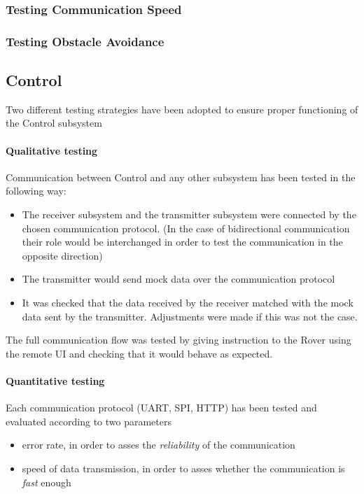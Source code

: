 \documentclass[10pt,twoside]{article}
\begin{document}
\subsubsection{Testing Communication Speed}

\subsubsection{Testing Obstacle Avoidance}


\subsection{Control}
Two different testing strategies have been adopted to ensure proper functioning of the Control subsystem
\paragraph{Qualitative testing} Communication between Control and any other subsystem has been tested in the following way:
\begin{itemize}[nolistsep]
    \item The receiver subsystem and the transmitter subsystem were connected by the chosen communication protocol. (In the case of bidirectional communication their role would be interchanged in order to test the communication in the opposite direction)
    \item The transmitter would send mock data over the communication protocol
    \item It was checked that the data received by the receiver matched with the mock data sent by the transmitter. Adjustments were made if this was not the case.
\end{itemize}

The full communication flow was tested by giving instruction to the Rover using the remote UI and checking that it would behave as expected.

\paragraph{Quantitative testing}
Each communication protocol (UART, SPI, HTTP) has been tested and evaluated according to two parameters
\begin{itemize}
    \item error rate, in order to asses the \emph{reliability} of the communication
    \item speed of data transmission, in order to asses whether the communication is \emph{fast} enough
\end{itemize}
\end{document}
